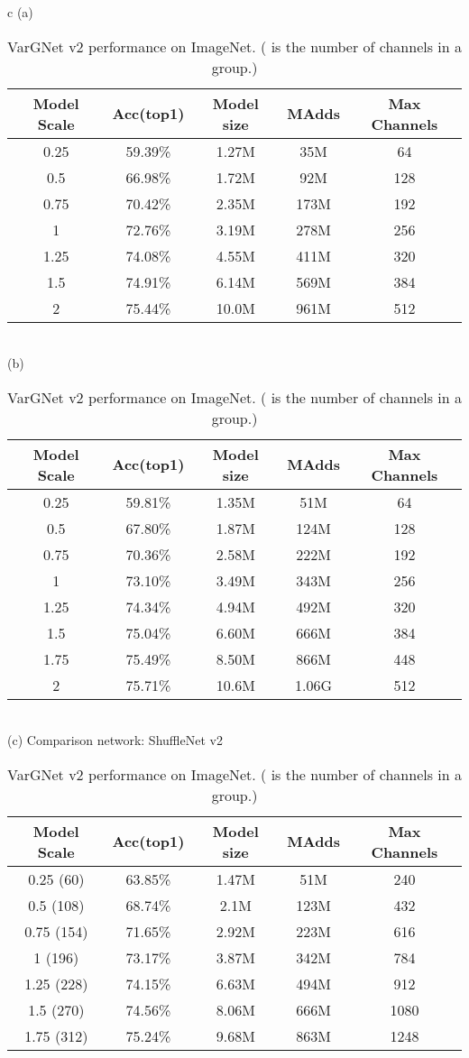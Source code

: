 \documentclass{article}
\begin{document}
\begin{table}
  \centering
  \caption{VarGNet v2 performance on ImageNet. ( is the number of channels in a group.)}\label{tab:vargnetv2_comp}
  \begin{tabular}{c}
    (a)  \\
    \begin{tabular}{ccccc}
      \toprule
      Model Scale & Acc(top1) & Model size & MAdds & Max Channels \\ \midrule
      0.25 & 59.39\% & 1.27M & 35M & 64 \\
      0.5 & 66.98\% & 1.72M & 92M & 128 \\
      0.75 & 70.42\% & 2.35M & 173M & 192 \\
      1 & 72.76\% & 3.19M & 278M & 256 \\
      1.25 & 74.08\% & 4.55M & 411M & 320 \\
      1.5 & 74.91\% & 6.14M & 569M & 384 \\
      2 & 75.44\% & 10.0M & 961M & 512 \\
      \bottomrule
    \end{tabular} \\
    (b)  \\
    \begin{tabular}{ccccc}
      \toprule
      Model Scale & Acc(top1) & Model size & MAdds & Max Channels \\ \midrule
      0.25 & 59.81\% & 1.35M & 51M & 64 \\
      0.5 & 67.80\% & 1.87M & 124M & 128 \\
      0.75 & 70.36\% & 2.58M & 222M & 192 \\
      1 & 73.10\% & 3.49M & 343M & 256 \\
      1.25 & 74.34\% & 4.94M & 492M & 320 \\
      1.5 & 75.04\% & 6.60M & 666M & 384 \\
      1.75 & 75.49\% & 8.50M & 866M & 448 \\
      2 & 75.71\% & 10.6M & 1.06G & 512 \\
      \bottomrule
    \end{tabular} \\
    (c) Comparison network: ShuffleNet v2\\
    \begin{tabular}{ccccc}
      \toprule
      Model Scale & Acc(top1) & Model size & MAdds & Max Channels \\ \midrule
      0.25 (60) & 63.85\% & 1.47M & 51M & 240 \\
      0.5 (108) & 68.74\% & 2.1M & 123M & 432 \\
      0.75 (154) & 71.65\% & 2.92M & 223M & 616 \\
      1 (196) & 73.17\% & 3.87M & 342M & 784 \\
      1.25 (228) & 74.15\% & 6.63M & 494M & 912 \\
      1.5 (270) & 74.56\% & 8.06M & 666M & 1080 \\
      1.75 (312) & 75.24\% & 9.68M & 863M & 1248 \\
      \bottomrule
    \end{tabular}
  \end{tabular}
\end{table}
\end{document}
